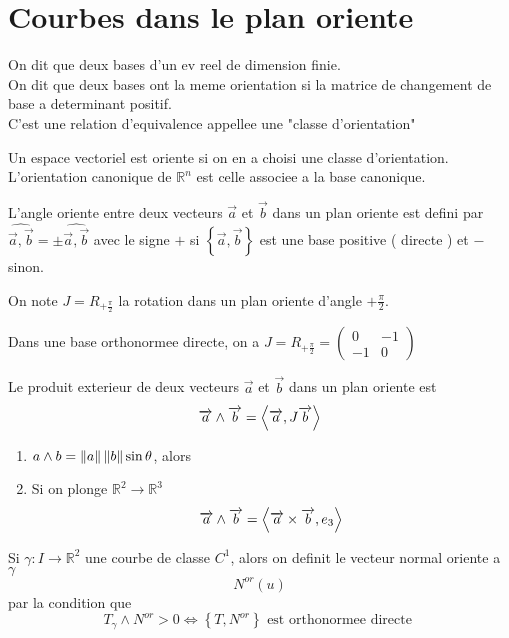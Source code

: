 \documentclass[../main.tex]{subfiles}
\begin{document}
\section{Courbes dans le plan oriente}
\begin{defn}
	On dit que deux bases d'un ev reel de dimension finie.\\
	On dit que deux bases ont la meme orientation si la matrice de changement de base a determinant positif.\\
	C'est une relation d'equivalence appellee une "classe d'orientation"
\end{defn}
Un espace vectoriel est oriente si on en a choisi une classe d'orientation.\\
L'orientation canonique de $ \mathbb{R}^{n}$ est celle associee a la base canonique.
\begin{defn}
	L'angle oriente entre deux vecteurs $\vec{a}$ et $\vec{b}$ dans un plan oriente est defini par $\hat { \vec{a},\vec{b}} = \pm \hat{ \vec{a},\vec{b}}$ avec le signe $+$ si $\left\{ \vec{a},\vec{b} \right\} $ est une base positive ( directe ) et $-$ sinon.
\end{defn}
\begin{defn}[L'operateur J ]
	On note $J = R_{+\frac{\pi}{2}} $ la rotation dans un plan oriente d'angle $+ \frac{\pi}{2}$.
\end{defn}
Dans une base orthonormee directe, on a $J = R_{+\frac{\pi}{2}} = \begin{pmatrix}
	0 & -1\\
	-1 & 0
\end{pmatrix} $ 
\begin{defn}
	Le produit exterieur de deux vecteurs $\vec{a}$ et $\vec{b}$ dans un plan oriente est
	\[ 
	\overrightarrow{a}\wedge \overrightarrow{b} =\left\langle \overrightarrow{a}, J\overrightarrow{b}\right\rangle 
	\]
	
\end{defn}
\begin{rmq}
\begin{enumerate}
\item $a \wedge b = \left\lVert a\right\rVert \left\lVert b\right\rVert \sin \theta$, alors
\item Si on plonge $ \mathbb{R}^{2}\to \mathbb{R}^{3}$ 
	\[ 
	\overrightarrow{a}\wedge \overrightarrow{b} = \left\langle \overrightarrow{a}\times \overrightarrow{b}, e_3\right\rangle 
	\]
	
\end{enumerate}
\end{rmq}
\begin{defn}
	Si $\gamma: I \to \mathbb{R}^{2}$ une courbe de classe $C^{1}$, alors on definit le vecteur normal oriente a $\gamma$ 
	\[ 
		N^{or}( u) 
	\]
	par la condition que
	\[ 
		T_\gamma \wedge N^{or}>0 \iff \left\{ T, N^{or}  \right\} \text{ est orthonormee directe } 
	\]
\end{defn}
\end{document}

